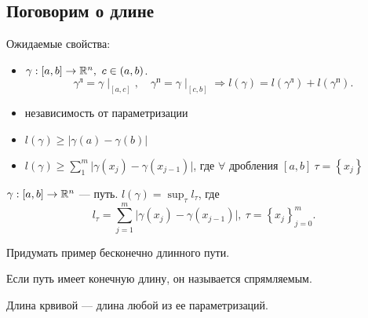 \subsection{Поговорим о длине}
Ожидаемые свойства:
\begin{itemize}[noitemsep]
    \item $ \gamma : [a, b] \to  \mathbb{R}^{n}, ~ c \in  (a, b) $. 
	\[
	    \gamma^{л} = \gamma \mid_{[a, c]}, \quad \gamma^{п} = \gamma\mid_{[c, b]} \Longrightarrow l(\gamma) = l(\gamma^{л}) + l(\gamma^{п})
	.\] 
    \item независимость от параметризации
    \item $ l(\gamma) \ge  \lvert \gamma(a) - \gamma(b) \rvert $
    \item
	$ l(\gamma) \ge \sum_{1}^{m} \lvert \gamma(x_j) - \gamma(x_{j-1}) \rvert $,
	где $ \forall  \text{ дробления }[a, b] ~\tau = \left\{ x_j \right\}  $
\end{itemize}
\begin{defn}
$ \gamma: [a, b] \to  \mathbb{R}^{n} $ --- путь. $ l(\gamma) = \sup_{\tau} l_{\tau}$, где   
\[
    l_{\tau} = \sum_{j=1}^{m} \lvert \gamma(x_j) -\gamma(x_{j-1}) \rvert, ~ \tau =  \left\{ x_j \right\}_{j=0}^{m}  
.\] 
\end{defn}
\begin{prac}
    Придумать пример бесконечно длинного пути.
\end{prac}
\begin{defn}
    Если путь имеет конечную длину, он называется {\sf спрямляемым}.
\end{defn}
\begin{defn}
    {\sf Длина крвивой} --- длина любой из ее параметризаций.  
\end{defn}

